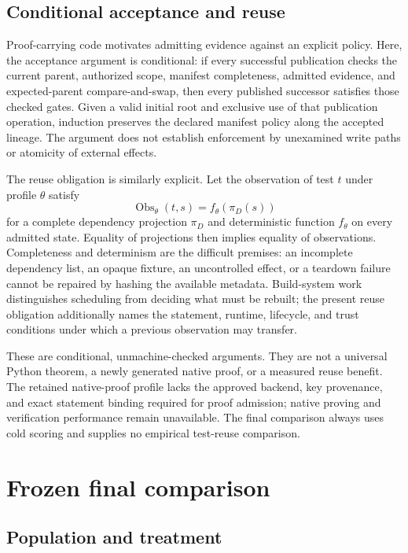 \subsection{Conditional acceptance and reuse}

Proof-carrying code motivates admitting evidence against an explicit
policy\citep{baseline01}. Here, the acceptance argument is conditional: if
every successful publication checks the current parent, authorized scope,
manifest completeness, admitted evidence, and expected-parent compare-and-swap,
then every published successor satisfies those checked gates. Given a valid
initial root and exclusive use of that publication operation, induction
preserves the declared manifest policy along the accepted lineage. The
argument does not establish enforcement by unexamined write paths or atomicity
of external effects.

The reuse obligation is similarly explicit. Let the observation of test $t$
under profile $\theta$ satisfy
\[
  \operatorname{Obs}_{\theta}(t,s)=f_{\theta}(\pi_D(s))
\]
for a complete dependency projection $\pi_D$ and deterministic function
$f_{\theta}$ on every admitted state. Equality of projections then implies
equality of observations. Completeness and determinism are the difficult
premises: an incomplete dependency list, an opaque fixture, an uncontrolled
effect, or a teardown failure cannot be repaired by hashing the available
metadata. Build-system work distinguishes scheduling from deciding what must
be rebuilt\citep{baseline07}; the present reuse obligation additionally names
the statement, runtime, lifecycle, and trust conditions under which a previous
observation may transfer.

These are conditional, unmachine-checked arguments. They are not a universal
Python theorem, a newly generated native proof, or a measured reuse benefit.
The retained native-proof profile lacks the approved backend, key provenance,
and exact statement binding required for proof admission; native proving and
verification performance remain unavailable. The final comparison always uses
cold scoring and supplies no empirical test-reuse comparison.

\section{Frozen final comparison}
\label{sec:fixed-final-method}

\subsection{Population and treatment}

